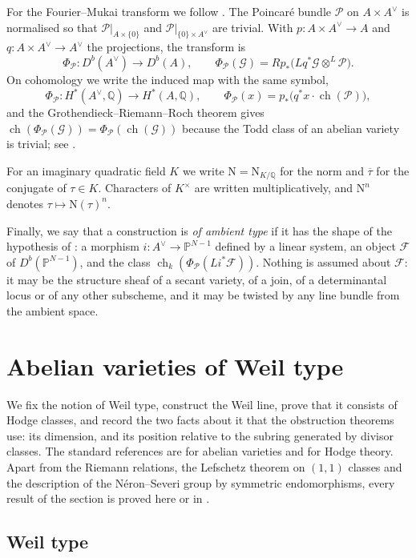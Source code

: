 \documentclass[11pt,reqno]{amsart}
\theoremstyle{plain}
\theoremstyle{definition}
\theoremstyle{remark}
\newcommand{\QQ}{\mathbb{Q}}
\newcommand{\PP}{\mathbb{P}}
\newcommand{\Av}{A^{\vee}}
\newcommand{\cP}{\mathcal{P}}
\newcommand{\cF}{\mathcal{F}}
\newcommand{\cG}{\mathcal{G}}
\newcommand{\Nm}{\mathrm{N}}             %
\DeclareMathOperator{\ch}{ch}
\newcommand{\Kx}{K^{\times}}
\newcommand{\bbar}[1]{\overline{#1}}
\begin{document}
For the Fourier--Mukai transform we follow \cite{Muk81}. The Poincar\'e bundle
$\cP$ on $A\times\Av$ is normalised so that $\cP|_{A\times\{0\}}$ and
$\cP|_{\{0\}\times\Av}$ are trivial. With $p\colon A\times\Av\to A$ and
$q\colon A\times\Av\to\Av$ the projections, the transform is
\[
  \Phi_{\cP}\colon D^{b}(\Av)\to D^{b}(A),
  \qquad
  \Phi_{\cP}(\cG)=Rp_{*}\bigl(Lq^{*}\cG\otimes^{L}\cP\bigr).
\]
On cohomology we write the induced map with the same symbol,
\[
  \Phi_{\cP}\colon H^{*}(\Av,\QQ)\longrightarrow H^{*}(A,\QQ),
  \qquad
  \Phi_{\cP}(x)=p_{*}\bigl(q^{*}x\cdot\ch(\cP)\bigr),
\]
and the Grothendieck--Riemann--Roch theorem gives
$\ch(\Phi_{\cP}(\cG))=\Phi_{\cP}(\ch(\cG))$ because the Todd class of an
abelian variety is trivial; see .

For an imaginary quadratic field $K$ we write $\Nm=\Nm_{K/\QQ}$ for the norm
and $\bbar{\tau}$ for the conjugate of $\tau\in K$. Characters of $\Kx$ are
written multiplicatively, and $\Nm^{n}$ denotes $\tau\mapsto\Nm(\tau)^{n}$.

Finally, we say that a construction is \emph{of ambient type} if it has the
shape of the hypothesis of : a morphism
$i\colon\Av\to\PP^{N-1}$ defined by a linear system, an object $\cF$ of
$D^{b}(\PP^{N-1})$, and the class $\ch_{k}(\Phi_{\cP}(Li^{*}\cF))$. Nothing is
assumed about $\cF$: it may be the structure sheaf of a secant variety, of a
join, of a determinantal locus or of any other subscheme, and it may be
twisted by any line bundle from the ambient space.
\section{Abelian varieties of Weil type}\label{sec:weiltype}

We fix the notion of Weil type, construct the Weil line, prove that it
consists of Hodge classes, and record the two facts about it that the
obstruction theorems use: its dimension, and its position relative to the
subring generated by divisor classes. The standard references are \cite{BL04}
for abelian varieties and \cite{Voi02} for Hodge theory. Apart from the
Riemann relations, the Lefschetz theorem on $(1,1)$ classes and the
description of the N\'eron--Severi group by symmetric endomorphisms, every
result of the section is proved here or in .

\subsection{Weil type}
\end{document}
